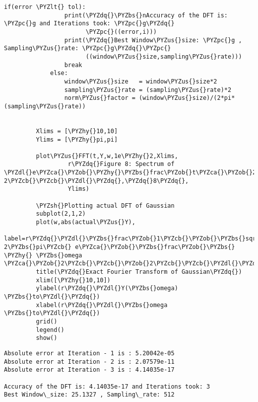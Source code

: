 \documentclass[11pt]{article}
\def\PYZbs{\char`\\}
\def\PYZus{\char`\_}
\def\PYZob{\char`\{}
\def\PYZcb{\char`\}}
\def\PYZca{\char`\^}
\def\PYZlt{\char`\<}
\def\PYZsh{\char`\#}
\def\PYZpc{\char`\%}
\def\PYZdl{\char`\$}
\def\PYZhy{\char`\-}
\def\PYZdq{\char`\"}
\begin{document}
\begin{Verbatim}[commandchars=\\\{\}]
             if(error \PYZlt{} tol):
                 print(\PYZdq{}\PYZbs{}nAccuracy of the DFT is: \PYZpc{}g and Iterations took: \PYZpc{}g\PYZdq{}
                       \PYZpc{}((error,i)))
                 print(\PYZdq{}Best Window\PYZus{}size: \PYZpc{}g , Sampling\PYZus{}rate: \PYZpc{}g\PYZdq{}\PYZpc{}
                       ((window\PYZus{}size,sampling\PYZus{}rate)))
                 break
             else:
                 window\PYZus{}size   = window\PYZus{}size*2
                 sampling\PYZus{}rate = (sampling\PYZus{}rate)*2
                 norm\PYZus{}factor = (window\PYZus{}size)/(2*pi*(sampling\PYZus{}rate))
             
         
         Xlims = [\PYZhy{}10,10]
         Ylims = [\PYZhy{}pi,pi]
         
         plot\PYZus{}FFT(t,Y,w,1e\PYZhy{}2,Xlims,
                  r\PYZdq{}Figure 8: Spectrum of \PYZdl{}e\PYZca{}\PYZob{}\PYZhy{}\PYZbs{}frac\PYZob{}t\PYZca{}\PYZob{}2\PYZcb{}\PYZcb{}\PYZob{} 2\PYZcb{}\PYZcb{}\PYZdl{}\PYZdq{},\PYZdq{}8\PYZdq{},
                  Ylims)
         
         \PYZsh{}Plotting actual DFT of Gaussian
         subplot(2,1,2)
         plot(w,abs(actual\PYZus{}Y),
              label=r\PYZdq{}\PYZdl{}\PYZbs{}frac\PYZob{}1\PYZcb{}\PYZob{}\PYZbs{}sqrt 2\PYZbs{}pi\PYZcb{} e\PYZca{}\PYZob{}\PYZbs{}frac\PYZob{}\PYZbs{} \PYZhy{} \PYZbs{}omega \PYZca{}\PYZob{}2\PYZcb{}\PYZcb{}\PYZob{}2\PYZcb{}\PYZcb{}\PYZdl{}\PYZdq{})
         title(\PYZdq{}Exact Fourier Transform of Gaussian\PYZdq{})
         xlim([\PYZhy{}10,10])
         ylabel(r\PYZdq{}\PYZdl{}Y(\PYZbs{}omega) \PYZbs{}to\PYZdl{}\PYZdq{})
         xlabel(r\PYZdq{}\PYZdl{}\PYZbs{}omega \PYZbs{}to\PYZdl{}\PYZdq{})
         grid()
         legend()
         show()
\end{Verbatim}


    \begin{Verbatim}[commandchars=\\\{\}]
Absolute error at Iteration - 1 is : 5.20042e-05
Absolute error at Iteration - 2 is : 2.07579e-11
Absolute error at Iteration - 3 is : 4.14035e-17

Accuracy of the DFT is: 4.14035e-17 and Iterations took: 3
Best Window\_size: 25.1327 , Sampling\_rate: 512

    \end{Verbatim}

    \begin{center}
    \end{center}
    { \hspace*{\fill} \\}
    
\end{document}
